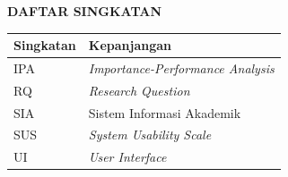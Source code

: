 {}
\begin{center}
    \textbf{\large DAFTAR SINGKATAN}\\[2em]
\end{center}

\begin{center}
\begin{tabular}{|l|l|}
    \hline
    \textbf{Singkatan} & \textbf{Kepanjangan}                        \\ \hline
    IPA                & \textit{Importance-Performance Analysis}    \\ \hline
    RQ                 & \textit{Research Question}                  \\ \hline
    SIA                & Sistem Informasi Akademik                   \\ \hline
    SUS                & \textit{System Usability Scale}             \\ \hline
    UI                 & \textit{User Interface}                     \\ \hline
\end{tabular}
\end{center}
\clearpage
